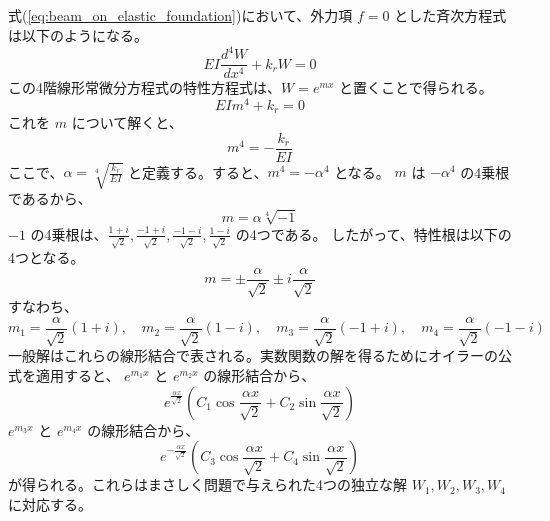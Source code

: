 \documentclass[dvipdfmx,a4paper]{jsarticle}
\begin{document}
    \subsection*{}
    式(\ref{eq:beam_on_elastic_foundation})において、外力項 $f=0$ とした斉次方程式は以下のようになる。
    \begin{equation}
        EI\frac{d^4W}{dx^4}+k_rW=0
    \end{equation}
    この4階線形常微分方程式の特性方程式は、$W=e^{mx}$ と置くことで得られる。
    \begin{equation}
        EIm^4 + k_r = 0
    \end{equation}
    これを $m$ について解くと、
    \begin{equation}
       m^4 = -\frac{k_r}{EI} 
    \end{equation}
    ここで、$\alpha = \sqrt[4]{\frac{k_r}{EI}}$ と定義する。すると、$m^4 = -\alpha^4$ となる。
    $m$ は $-\alpha^4$ の4乗根であるから、
    \begin{equation}
        m = \alpha \sqrt[4]{-1}
    \end{equation}
    $-1$ の4乗根は、$\frac{1+i}{\sqrt{2}}, \frac{-1+i}{\sqrt{2}}, \frac{-1-i}{\sqrt{2}}, \frac{1-i}{\sqrt{2}}$ の4つである。
    したがって、特性根は以下の4つとなる。
    \begin{equation}
        m = \pm \frac{\alpha}{\sqrt{2}} \pm i\frac{\alpha}{\sqrt{2}}
    \end{equation}
    すなわち、
    \begin{equation}
        m_1 = \frac{\alpha}{\sqrt{2}}(1+i), \quad m_2 = \frac{\alpha}{\sqrt{2}}(1-i), \quad m_3 = \frac{\alpha}{\sqrt{2}}(-1+i), \quad m_4 = \frac{\alpha}{\sqrt{2}}(-1-i)
    \end{equation}
    一般解はこれらの線形結合で表される。実数関数の解を得るためにオイラーの公式を適用すると、
    $e^{m_1 x}$ と $e^{m_2 x}$ の線形結合から、
    \begin{equation}
        e^{\frac{\alpha x}{\sqrt{2}}} \left( C_1 \cos\frac{\alpha x}{\sqrt{2}} + C_2 \sin\frac{\alpha x}{\sqrt{2}} \right)
    \end{equation}
    $e^{m_3 x}$ と $e^{m_4 x}$ の線形結合から、
    \begin{equation}
        e^{-\frac{\alpha x}{\sqrt{2}}} \left( C_3 \cos\frac{\alpha x}{\sqrt{2}} + C_4 \sin\frac{\alpha x}{\sqrt{2}} \right)
    \end{equation}
    が得られる。これらはまさしく問題で与えられた4つの独立な解 $W_1, W_2, W_3, W_4$ に対応する。
    
\end{document}
